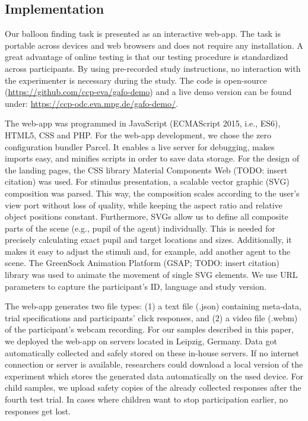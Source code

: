 \documentclass[
  man,floatsintext]{apa6}
\begin{document}
\hypertarget{implementation}{%
\subsection{Implementation}\label{implementation}}

Our balloon finding task is presented as an interactive web-app. The task is portable across devices and web browsers and does not require any installation. A great advantage of online testing is that our testing procedure is standardized across participants. By using pre-recorded study instructions, no interaction with the experimenter is necessary during the study. The code is open-source (\url{https://github.com/ccp-eva/gafo-demo}) and a live demo version can be found under: \url{https://ccp-odc.eva.mpg.de/gafo-demo/}.

The web-app was programmed in JavaScript (ECMAScript 2015, i.e., ES6), HTML5, CSS and PHP.
For the web-app development, we chose the zero configuration bundler Parcel. It enables a live server for debugging, makes imports easy, and minifies scripts in order to save data storage.
For the design of the landing pages, the CSS library Material Components Web (TODO: insert citation) was used.
For stimulus presentation, a scalable vector graphic (SVG) composition was parsed. This way, the composition scales according to the user's view port without loss of quality, while keeping the aspect ratio and relative object positions constant.
Furthermore, SVGs allow us to define all composite parts of the scene (e.g., pupil of the agent) individually. This is needed for precisely calculating exact pupil and target locations and sizes. Additionally, it makes it easy to adjust the stimuli and, for example, add another agent to the scene.
The GreenSock Animation Platform (GSAP; TODO: insert citation) library was used to animate the movement of single SVG elements.
We use URL parameters to capture the participant's ID, language and study version.

The web-app generates two file types: (1) a text file (.json) containing meta-data, trial specifications and participants' click responses, and (2) a video file (.webm) of the participant's webcam recording.
For our samples described in this paper, we deployed the web-app on servers located in Leipzig, Germany. Data got automatically collected and safely stored on these in-house servers. If no internet connection or server is available, researchers could download a local version of the experiment which stores the generated data automatically on the used device. For child samples, we upload safety copies of the already collected responses after the fourth test trial. In cases where children want to stop participation earlier, no responses get lost.
\end{document}
